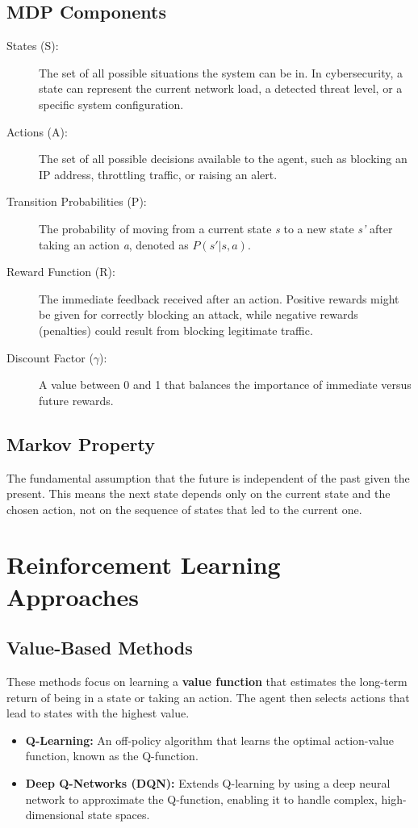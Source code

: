 \documentclass[12pt]{report}
\begin{document}
\subsection{MDP Components}
\begin{description}
    \item[States (S):] The set of all possible situations the system can be in. In cybersecurity, a state can represent the current network load, a detected threat level, or a specific system configuration.
    \item[Actions (A):] The set of all possible decisions available to the agent, such as blocking an IP address, throttling traffic, or raising an alert.
    \item[Transition Probabilities (P):] The probability of moving from a current state \textit{s} to a new state \textit{s'} after taking an action \textit{a}, denoted as \(P(s'|s,a)\).
    \item[Reward Function (R):] The immediate feedback received after an action. Positive rewards might be given for correctly blocking an attack, while negative rewards (penalties) could result from blocking legitimate traffic.
    \item[Discount Factor (\(\gamma\)):] A value between 0 and 1 that balances the importance of immediate versus future rewards.
\end{description}

\subsection{Markov Property}
The fundamental assumption that the future is independent of the past given the present. This means the next state depends only on the current state and the chosen action, not on the sequence of states that led to the current one.

\section{Reinforcement Learning Approaches}

\subsection{Value-Based Methods}
These methods focus on learning a \textbf{value function} that estimates the long-term return of being in a state or taking an action. The agent then selects actions that lead to states with the highest value.
\begin{itemize}
    \item \textbf{Q-Learning:} An off-policy algorithm that learns the optimal action-value function, known as the Q-function.
    \item \textbf{Deep Q-Networks (DQN):} Extends Q-learning by using a deep neural network to approximate the Q-function, enabling it to handle complex, high-dimensional state spaces.
\end{itemize}
\end{document}
